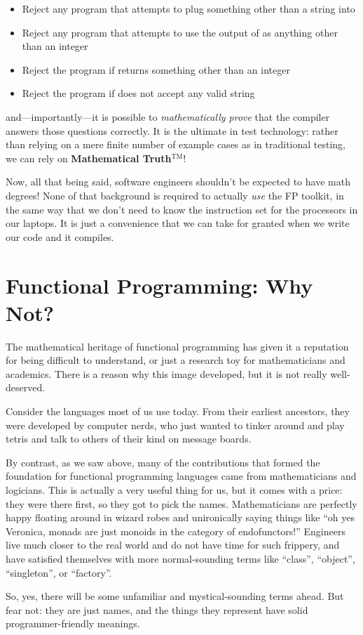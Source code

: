 \begin{itemize}
    \item Reject any program that attempts to plug something other than a string into 
    \item Reject any program that attempts to use the output of  as anything other than an integer
    \item Reject the program if  returns something other than an integer
    \item Reject the program if  does not accept any valid string
\end{itemize}

\noindent and---importantly---it is possible to \emph{mathematically prove} that the compiler answers those questions correctly. It is the ultimate in test technology: rather than relying on a mere finite number of example cases as in traditional testing, we can rely on \textbf{Mathematical Truth}\( ^{\text{TM}} \)!

Now, all that being said, software engineers shouldn't be expected to have math degrees! None of that background is required to actually \emph{use} the FP toolkit, in the same way that we don't need to know the instruction set for the processors in our laptops. It is just a convenience that we can take for granted when we write our code and it compiles.

\section{Functional Programming: Why Not?}

The mathematical heritage of functional programming has given it a reputation for being difficult to understand, or just a research toy for mathematicians and academics. There is a reason why this image developed, but it is not really well-deserved.

Consider the languages most of us use today. From their earliest ancestors, they were developed by computer nerds, who just wanted to tinker around and play tetris and talk to others of their kind on message boards.

By contrast, as we saw above, many of the contributions that formed the foundation for functional programming languages came from mathematicians and logicians. This is actually a very useful thing for us, but it comes with a price: they were there first, so they got to pick the names. Mathematicians are perfectly happy floating around in wizard robes and unironically saying things like ``oh yes Veronica, monads are just monoids in the category of endofunctors!'' Engineers live much closer to the real world and do not have time for such frippery, and have satisfied themselves with more normal-sounding terms like ``class'', ``object'', ``singleton'', or ``factory''.

So, yes, there will be some unfamiliar and mystical-sounding terms ahead. But fear not: they are just names, and the things they represent have solid programmer-friendly meanings.

